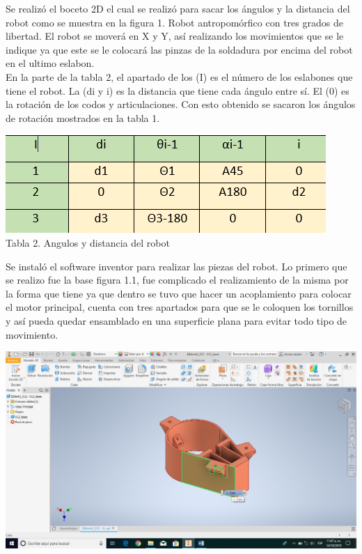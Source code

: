 \documentclass[12pt,letterpaper]{article}
\begin{document}
Se realizó el boceto 2D el cual se realizó para sacar los ángulos y la distancia del robot como se muestra en la figura 1. Robot antropomórfico con tres grados de libertad. El robot se moverá en X y Y, así realizando los movimientos que se le indique ya que este se le colocará las pinzas de la soldadura por encima del robot en el ultimo eslabon.
\\
En la parte de la tabla 2, el apartado de los (I) es el número de los eslabones que tiene el robot. La (di y i) es la distancia que tiene cada ángulo entre sí. El (0) es la rotación de los codos y articulaciones.
Con esto obtenido se sacaron los ángulos de rotación mostrados en la tabla 1.

\begin{center}
\includegraphics[scale=1]{imag7.png}\\
Tabla 2. Angulos y distancia del robot
\end{center}
\begin{flushleft}
Se instaló el software inventor para realizar las piezas del robot. Lo primero que se realizo fue la base figura 1.1, fue complicado el realizamiento de la misma por la forma que tiene ya que dentro se tuvo que hacer un acoplamiento para colocar el motor principal, cuenta con tres apartados para que se le coloquen los tornillos y así pueda quedar ensamblado en una superficie plana para evitar todo tipo de movimiento.
\end{flushleft}
\includegraphics[scale=0.5]{imag8.png} 
\end{document}
